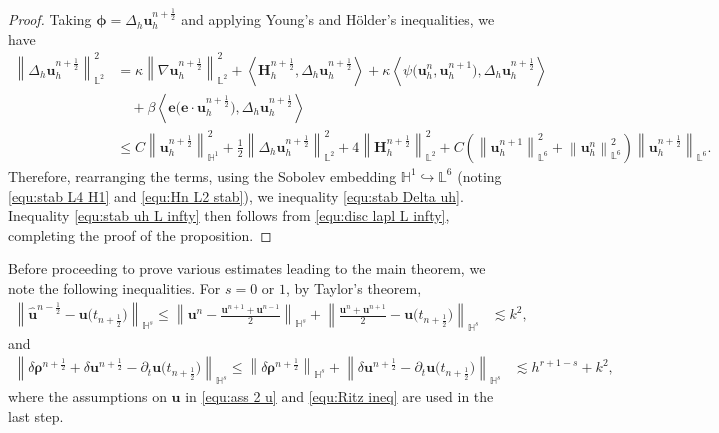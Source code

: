 \documentclass[11pt, reqno]{amsart}
\theoremstyle{definition}
\theoremstyle{remark}
\numberwithin{equation}{section}
\newcommand{\bff}{\boldsymbol}
\newcommand{\bb}{\mathbb}
\newcommand{\norm}[2]{\left\|{#1}\right\|_{#2}}
\newcommand{\inpro}[2]{\left\langle#1,#2\right\rangle}
\begin{document}
\begin{proof}
Taking $\bff{\phi}=\Delta_h \bff{u}_h^{n+\frac12}$ and applying Young's and H\"older's inequalities, we have
\begin{align*}
	\norm{\Delta_h \bff{u}_h^{n+\frac12}}{\bb{L}^2}^2
	&=
	\kappa \norm{\nabla \bff{u}_h^{n+\frac12}}{\bb{L}^2}^2
	+
	\inpro{\bff{H}_h^{n+\frac{1}{2}}}{\Delta_h \bff{u}_h^{n+\frac12}}
	+
	\kappa \inpro{\psi \big(\bff{u}_h^n, \bff{u}_h^{n+1}\big)}{\Delta_h \bff{u}_h^{n+\frac12}}
	\\
	&\quad
	+
	\beta\inpro{\bff{e}\big(\bff{e}\cdot \bff{u}_h^{n+\frac12}\big)}{\Delta_h \bff{u}_h^{n+\frac12}}
	\\
	&\leq
	C\norm{\bff{u}_h^{n+\frac12}}{\bb{H}^1}^2
	+
	\frac{1}{2} \norm{\Delta_h \bff{u}_h^{n+\frac12}}{\bb{L}^2}^2
	+
	4 \norm{\bff{H}_h^{n+\frac{1}{2}}}{\bb{L}^2}^2
	+
	C \left( \norm{\bff{u}_h^{n+1}}{\bb{L}^6}^2 + \norm{\bff{u}_h^n}{\bb{L}^6}^2 \right) \norm{\bff{u}_h^{n+\frac{1}{2}}}{\bb{L}^6}.
\end{align*}
Therefore, rearranging the terms, using the Sobolev embedding $\bb{H}^1 \hookrightarrow \bb{L}^6$ (noting \eqref{equ:stab L4 H1} and \eqref{equ:Hn L2 stab}), we inequality \eqref{equ:stab Delta uh}.
Inequality \eqref{equ:stab uh L infty} then follows from \eqref{equ:disc lapl L infty}, completing the proof of the proposition.
\end{proof}

Before proceeding to prove various estimates leading to the main theorem, we note the following inequalities. For $s=0$ or $1$, by Taylor's theorem,
\begin{align}\label{equ:u hat u half}
	\norm{\widehat{\bff{u}}^{n-\frac{1}{2}}- \bff{u}\big(t_{n+\frac{1}{2}}\big)}{\bb{H}^s}
	\leq
	\norm{\bff{u}^n- \frac{\bff{u}^{n+1}+\bff{u}^{n-1}}{2}}{\bb{H}^s}
	+
	\norm{\frac{\bff{u}^n+\bff{u}^{n+1}}{2}- \bff{u}\big(t_{n+\frac{1}{2}}\big)}{\bb{H}^s}
	&\lesssim
	k^2,
\end{align}
and
\begin{align}\label{equ:d rho dt u}
	\norm{\delta \bff{\rho}^{n+\frac{1}{2}} + \delta \bff{u}^{n+\frac{1}{2}}-\partial_t \bff{u}\big(t_{n+\frac{1}{2}}\big)}{\bb{H}^s}
	\leq
	\norm{\delta \bff{\rho}^{n+\frac{1}{2}}}{\bb{H}^s} + \norm{\delta \bff{u}^{n+\frac{1}{2}}-\partial_t \bff{u}\big(t_{n+\frac{1}{2}}\big)}{\bb{H}^s}
	&\lesssim
	h^{r+1-s}+k^2,
\end{align}
where the assumptions on $\bff{u}$ in \eqref{equ:ass 2 u} and \eqref{equ:Ritz ineq} are used in the last step.
\end{document}

